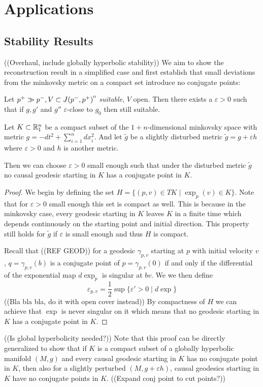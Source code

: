 \chapter{Applications}

\section{Stability Results}
((Overhaul, include globally hyperbolic stability))
We aim to show the reconstruction result in a simplified case and first establish that small deviations from the minkovsky metric on a compact set introduce no conjugate points:
\begin{proposition}
    Let $p^+\gg p^-, V\subset {\kern0ptJ(p^-,p^+)}^{\mathrm{o}}$ \emph{suitable}, $V$ open. Then there exists a $\varepsilon>0$ such that if $g,g'$ and $g''$ $\varepsilon$-close to $g_0$ then still suitable.
\end{proposition}


\begin{proposition}
Let $K\subset\mathbb{R}^n_1$ be a compact subset of the $1+n$-dimensional minkovsky space with metric $g=-dt^2+\sum_{i=1}^n dx_i^2$. And let $\widetilde{g}$ be a slightly disturbed metric $\widetilde{g}=g+\varepsilon h$ where $\varepsilon>0$ and $h$ is another metric.

Then we can choose $\varepsilon>0$ small enough such that under the disturbed metric $\widetilde{g}$ no causal geodesic starting in $K$ has a conjugate point in $K$.
\end{proposition}
\begin{proof}
We begin by defining the set $H = \{(p,v)\in TK \mid \exp_p(v) \in K\}$. Note that for $\varepsilon>0$ small enough this set is compact as well. This is because in the minkovsky case, every geodesic starting in $K$ leaves $K$ in a finite time which depends continuously on the starting point and initial direction. This property still holds for $\widetilde{g}$ if $\varepsilon$ is small enough and thus $H$ is compact.

Recall that ((REF GEOD)) for a geodesic $\gamma_{p,v}$ starting at $p$ with initial velocity $v$, $q=\gamma_{p,v}(b)$ is a conjugate point of $p=\gamma_{p,v}(0)$ if and only if the differential of the exponential map $d\exp_p$ is singular at $bv$. 
We we then define 
\[
    \varepsilon_{p,v} = \frac{1}{2}\sup\{\varepsilon'>0\mid d\exp\}
\]((Bla bla bla, do it with open cover instead))
By compactness of $H$ we can achieve that $\exp$ is never singular on it which means that no geodesic starting in $K$ has a conjugate point in $K$. 
\end{proof}
((Is global hyperbolicity needed?))
Note that this proof can be directly generalized to show that if $K$ is a compact subset of a globally hyperbolic manifold $(M,g)$ and every causal geodesic starting in $K$ has no conjugate point in $K$, then also for a slightly perturbed $(M,g+\varepsilon h)$, causal geodesics starting in $K$ have no conjugate points in $K$.
((Expand conj point to cut points?))



